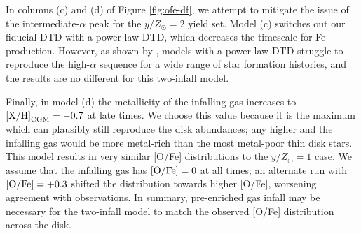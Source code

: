 \documentclass[twocolumn,twocolappendix,linenumbers]{aastex631}
\begin{document}
In columns (c) and (d) of Figure \ref{fig:ofe-df}, we attempt to mitigate the issue of the intermediate-$\alpha$ peak for the $y/Z_\odot=2$ yield set. Model (c) switches out our fiducial DTD with a power-law DTD, which decreases the timescale for Fe production. However, as shown by \citet{dubay_galactic_2024}, models with a power-law DTD struggle to reproduce the high-$\alpha$ sequence for a wide range of star formation histories, and the results are no different for this two-infall model. 

Finally, in model (d) the metallicity of the infalling gas increases to ${\rm [X/H]}_{\rm CGM}=-0.7$ at late times. We choose this value because it is the maximum which can plausibly still reproduce the disk abundances; any higher and the infalling gas would be more metal-rich than the most metal-poor thin disk stars. This model results in very similar [O/Fe] distributions to the $y/Z_\odot=1$ case. We assume that the infalling gas has ${\rm [O/Fe]}=0$ at all times; an alternate run with ${\rm [O/Fe]}=+0.3$ shifted the distribution towards higher [O/Fe], worsening agreement with observations. In summary, pre-enriched gas infall may be necessary for the two-infall model to match the observed [O/Fe] distribution across the disk.
\end{document}
